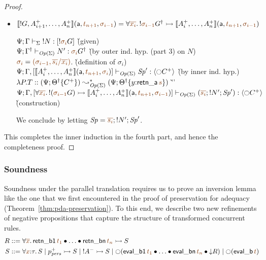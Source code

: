 \begin{proof}
\begin{itemize}
\item $\opbasic{{!}G,A^+_{i+1},\ldots,A^+_n}{t_{n+1}}{\sigma_{i-1}} = \forall
  \lf{\overline{x_i}}.\, {!}\lf{\sigma_{i-1}}\opsubst{G} \lefti
  \opbasic{A^+_i,\ldots,A^+_n}{t_{n+1}}{\sigma_{i-1}}$

  \begin{tabbing}
  $\slst{\Sigma}{\Psi}{\Gamma}{\tbangr{N}}{[{!}\lf{\sigma_i}{G}]}$
  \` (given) 
  \\
  $\slst{\transop{\Sigma}}{\Psi}{\opsubst{\Gamma}}{N'}{\lf{\sigma_i}{\opsubst{G}}}$
  \` (by outer ind. hyp. (part 3)  on $N$) 
  \\
  $\lf{\sigma_i} = \lf{(\sigma_{i-1}, \overline{s_i}/\overline{x_i})}$.
  \` (definition of $\sigma_i$)
  \\
  $\slst{\transop{\Sigma}}{\Psi}{\Gamma, [\opbasic{A^+_i,\ldots,A^+_n}{t_{n+1}}{\sigma_{i}}]}{\Sp'}{\susp{{\ocircle}C^+}}$
  \` (by inner ind. hyp.)
  \\
  $\lambda P.T :: (\Psi; \tackon{\opsubst{\Theta}}{C^+}) \leadsto^*_{\transop{\Sigma}}
   (\Psi; \tackon{\opsubst{\Theta}}{y{:}{\sf retn\_a}\,\lf{s}})$
 \` ''\qquad\qquad~
  \\
  $\slst{\transop{\Sigma}}{\Psi}
    {\Gamma, [\forall \lf{\overline{x_i}}.\, {!}(\lf{\sigma_{i-1}}{G})
                \lefti \opbasic{A^+_i,\ldots,A^+_n}{t_{n+1}}{\sigma_{i-1}}]}
    {(\lf{\overline{s_i}}; \tbangr{N'}; \Sp')}
    {\susp{{\ocircle}C^+}}$
  \\ 
  \` (construction)
  \end{tabbing}
  We conclude  by letting $\Sp = \lf{\overline{s_i}}; \tbangr{N'}; \Sp'$.
\end{itemize}
\smallskip

\noindent
This completes the inner induction in the fourth part, and hence
the completeness proof.
\end{proof}

\subsubsection{Soundness}

Soundness under the parallel translation requires us to prove an
inversion lemma like the one that we first encountered in the proof of
preservation for adequacy (Theorem~\ref{thm:pda-preservation}).
To this end, we describe two new refinements of negative
propositions that capture the structure of transformed concurrent
rules. 
\begin{align*}
R & ::= \forall \lf{\overline{x}}.\,{\sf retn\_b1}\,\lf{t_1} \fuse \ldots \fuse {\sf retn\_bn}\,\lf{t_n} \lefti S
\\
S & ::= \forall \lf{x}{:}\tau.\,S 
   \mid p^+_\mpers \lefti S
   \mid {!}A^- \lefti S
   \mid {\ocircle}({\sf eval\_b1}\,\lf{t_1} \fuse \ldots \fuse {\sf eval\_bn}\,\lf{t_n} 
           \fuse {\downarrow}R)
   \mid {\ocircle}({\sf eval\_b}\,\lf{t})
\end{align*}

